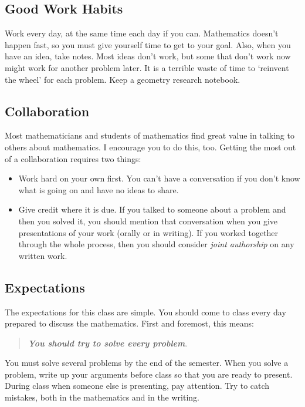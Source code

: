 \documentclass{tufte-handout}
\theoremstyle{definition}
\begin{document}
\subsection*{Good Work Habits} 
Work every day, at the same time each day if you can.
Mathematics doesn't happen fast, so you must give yourself time to get to your goal.
Also, when you have an idea, take notes.
Most ideas don't work, but some that don't work now might work for another problem later.
It is a terrible waste of time to `reinvent the wheel' for each problem.
Keep a geometry research notebook.

\subsection*{Collaboration}
Most mathematicians and students of mathematics find great value in talking to others about mathematics.
I encourage you to do this, too.
Getting the most out of a collaboration requires two things:
\begin{itemize}
\item Work hard on your own first. 
You can't have a conversation if you don't know what is going on and have no ideas to share. 

\item Give credit where it is due. 
If you talked to someone about a problem and then you solved it, you should mention that conversation when you give presentations of your work (orally or in writing).
If you worked together through the whole process, then you should consider \emph{joint authorship} on any written work.

\end{itemize}


\subsection*{Expectations} 
The expectations for this class are simple.
You should come to class every day prepared to discuss the mathematics. First and foremost, this means:
\begin{quotation}
\textbf{\emph{You should try to solve every problem}}.
\end{quotation}
You must solve several problems by the end of the semester.
When you solve a problem, write up your arguments before class so that you are ready to present.
During class when someone else is presenting, pay attention.
Try to catch  mistakes, both in the mathematics and in the writing. 
\end{document}
